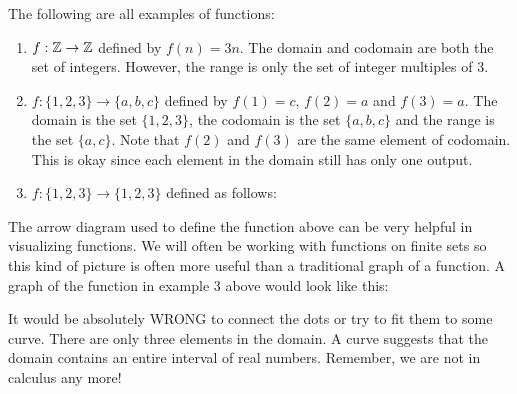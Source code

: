 \documentclass[12pt]{article}
\begin{document}
\begin{example}
  The following are all examples of functions:
  \begin{enumerate}
    \item $f:\mathbb Z \to \mathbb Z$ defined by $f(n) = 3n$.  The domain and codomain are both the set of integers.  However, the range is only the set of integer multiples of 3.
    \item $f: \{1,2,3\} \to \{a,b,c\}$ defined by $f(1) = c$, $f(2) = a$ and $f(3) = a$.  The domain is the set $\{1,2,3\}$, the codomain is the set $\{a,b,c\}$ and the range is the set $\{a,c\}$.  Note that $f(2)$ and $f(3)$ are the same element of codomain.  This is okay since each element in the domain still has only one output.
    \item $f:\{1,2,3\} \to \{1,2,3\}$ defined as follows:
    \begin{center}

    \end{center}

  \end{enumerate}

\end{example}

The arrow diagram used to define the function above can be very helpful in visualizing functions.  We will often be working with functions on finite sets so this kind of picture is often more useful than a traditional graph of a function.  A graph of the function in example 3 above would look like this:

\begin{center}

\end{center}

It would be absolutely WRONG to connect the dots or try to fit them to some curve.  There are only three elements in the domain.  A curve suggests that the domain contains an entire interval of real numbers.  Remember, we are not in calculus any more!
\end{document}
